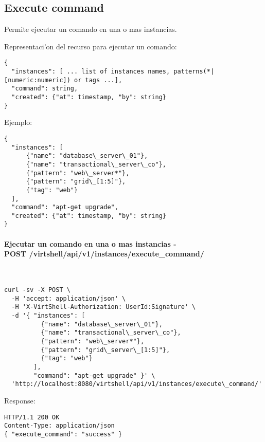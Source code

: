 \subsection{Execute command}

Permite ejecutar un comando en una o mas instancias.

Representaci'on del recurso para ejecutar un comando:

\medskip
\begin{lstlisting}[style=json]
{
  "instances": [ ... list of instances names, patterns(*|[numeric:numeric]) or tags ...],
  "command": string,
  "created": {"at": timestamp, "by": string}
}
\end{lstlisting}

Ejemplo:

\medskip
\begin{lstlisting}[style=json]
{
  "instances": [
      {"name": "database\_server\_01"},
      {"name": "transactional\_server\_co"},      
      {"pattern": "web\_server*"},
      {"pattern": "grid\_[1:5]"},
      {"tag": "web"}
  ],
  "command": "apt-get upgrade",
  "created": {"at": timestamp, "by": string}
}
\end{lstlisting}

\paragraph{Ejecutar un comando en una o mas instancias - \\ POST /virtshell/api/v1/instances/execute\_command/} ~\\

\begin{lstlisting}[style=json]
curl -sv -X POST \
  -H 'accept: application/json' \
  -H 'X-VirtShell-Authorization: UserId:Signature' \
  -d '{ "instances": [
          {"name": "database\_server\_01"},
          {"name": "transactional\_server\_co"},          
          {"pattern": "web\_server*"},
          {"pattern": "grid\_server\_[1:5]"},
          {"tag": "web"}
        ],
        "command": "apt-get upgrade" }' \
  'http://localhost:8080/virtshell/api/v1/instances/execute\_command/'
\end{lstlisting}

Response:

\begin{lstlisting}[style=json]
HTTP/1.1 200 OK
Content-Type: application/json
{ "execute_command": "success" }
\end{lstlisting}


